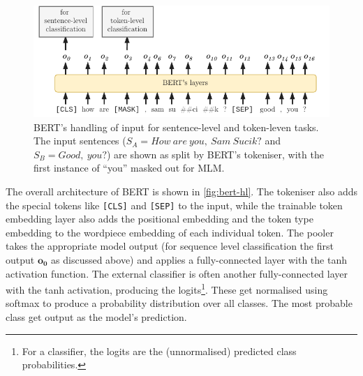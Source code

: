\documentclass[bsc,frontabs,singlespacing,parskip,deptreport]{infthesis}
\begin{document}
{{{      \begin{figure}[h!t]
        \centering
        \includegraphics[width=14cm]{graphics/bert-inputs}
        \caption{BERT's handling of input for sentence-level and token-leven tasks. The input sentences ($S_A = How\ are\ you,\ Sam\ Sucik?$ and $S_B = Good,\ you?$) are shown as split by BERT's tokeniser, with the first instance of ``you'' masked out for MLM.}
        \label{fig:bert-inputs}
      \end{figure}
      The overall architecture of BERT is shown in \autoref{fig:bert-hl}. The tokeniser also adds the special tokens like \verb|[CLS]| and \verb|[SEP]| to the input, while the trainable token embedding layer also adds the positional embedding and the token type embedding to the wordpiece embedding of each individual token. The pooler takes the appropriate model output (for sequence level classification the first output $\bm{o_0}$ as discussed above) and applies a fully-connected layer with the tanh activation function.
      The external classifier is often another fully-connected layer with the tanh activation, producing the logits\footnote{For a classifier, the logits are the (unnormalised) predicted class probabilities.}. These get normalised using softmax to produce a probability distribution over all classes. The most probable class get output as the model's prediction.
      
}}}
\end{document}
